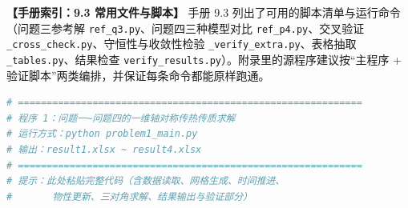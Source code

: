 \documentclass[12pt,a4paper]{article}
\newcommand{\tip}[1]{\par\noindent\textbf{【提示】} #1\par}
\newcommand{\handbook}[2]{\par\noindent\textbf{【手册索引：#1】} #2\par}
\begin{document}
\handbook{9.3 常用文件与脚本}{手册 9.3 列出了可用的脚本清单与运行命令（问题三参考解 \texttt{ref\_q3.py}、问题四三种模型对比 \texttt{ref\_p4.py}、交叉验证 \texttt{\_cross\_check.py}、守恒性与收敛性检验 \texttt{\_verify\_extra.py}、表格抽取 \texttt{\_tables.py}、结果检查 \texttt{verify\_results.py}）。附录里的源程序建议按“主程序 + 验证脚本”两类编排，并保证每条命令都能原样跑通。}

\begin{lstlisting}[language=Python,caption={程序清单占位（请替换为完整代码）}]
# ============================================================
# 程序 1：问题一~问题四的一维轴对称传热传质求解
# 运行方式：python problem1_main.py
# 输出：result1.xlsx ~ result4.xlsx
# ============================================================
# 提示：此处粘贴完整代码（含数据读取、网格生成、时间推进、
#       物性更新、三对角求解、结果输出与验证部分）
\end{lstlisting}
% 
% 
% 
% 
% 
% 
% 
% 
\end{document}
